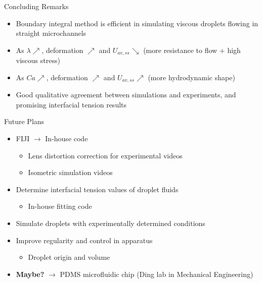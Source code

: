 \documentclass[final]{beamer}
\newlength{\colwidth}
\begin{document}
\begin{frame}[t]
\begin{columns}[t]
\begin{column}{\colwidth}
    \begin{exampleblock}{Concluding Remarks}
        \begin{itemize}
            \item Boundary integral method is efficient in simulating viscous droplets flowing in straight microchannels
            \item As $\lambda \nearrow$, deformation $\nearrow$ and $U_{av, ss} \searrow$ (more resistance to flow + high viscous stress)
            \item As $Ca \nearrow$, deformation $\nearrow$ and $U_{av, ss} \nearrow$ (more hydrodynamic shape)
            \item Good qualitative agreement between simulations and experiments, and promising interfacial tension results
        \end{itemize}
    \end{exampleblock}

    \begin{block}{Future Plans}
        \begin{itemize}
            \item FIJI $\rightarrow$ In-house code
            \begin{itemize}
                \item Lens distortion correction for experimental videos
                \item Isometric simulation videos
            \end{itemize}
            \item Determine interfacial tension values of droplet fluids
            \begin{itemize}
                \item In-house fitting code
            \end{itemize}
            \item Simulate droplets with experimentally determined conditions
            \item Improve regularity and control in apparatus
            \begin{itemize}
                \item Droplet origin and volume
            \end{itemize}
            \item \textbf{Maybe?} $\rightarrow$ PDMS microfluidic chip (Ding lab in Mechanical Engineering)
        \end{itemize}
    \end{block}


\end{column}
\end{columns}
\end{frame}
\end{document}
